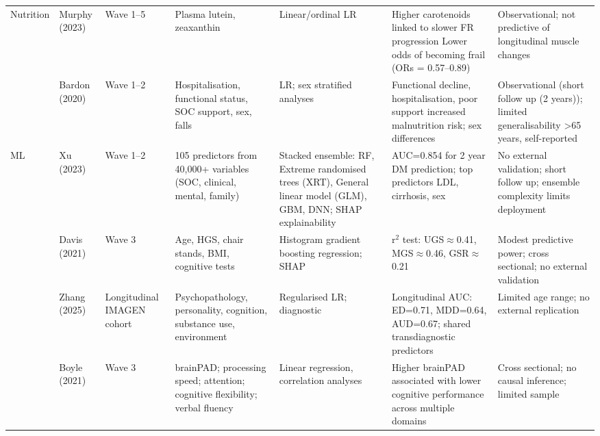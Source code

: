 \begin{table}[htbp]
{\begin{tabular}{p{2.5cm} p{2.5cm} p{2cm} p{4cm} p{4cm} p{4cm} p{4cm}}
\hline
\multirow{2}{*}{Nutrition} 
& Murphy (2023)~\cite{murphyPlasmaLuteinZeaxanthin2023} & Wave 1--5 & Plasma lutein, zeaxanthin & Linear/ordinal \gls{LR} & Higher carotenoids linked to slower \gls{FR} progression Lower odds of becoming frail (ORs = 0.57--0.89) & Observational; not predictive of longitudinal muscle changes \\
& Bardon (2020)~\cite{bardonPredictorsIncidentMalnutrition2020} & Wave 1--2 & Hospitalisation, functional status, \gls{SOC} support, sex, falls & \gls{LR}; sex stratified analyses & Functional decline, hospitalisation, poor support increased malnutrition risk; sex differences & Observational (short follow up (2 years)); limited generalisability >65 years, self-reported\\
\hline
\multirow{3}{*}{\gls{ML}} 
& Xu (2023)~\cite{xuTailoredMachineLearning2023} & Wave 1--2 & 105 predictors from 40,000+ variables (\gls{SOC}, clinical, mental, family) & Stacked ensemble: \gls{RF}, Extreme randomised trees (XRT), General linear model (GLM), \gls{GBM}, \gls{DNN}; \gls{SHAP} explainability & \gls{AUC}=0.854 for 2 year \gls{DM} prediction; top predictors LDL, cirrhosis, sex & No external validation; short follow up; ensemble complexity limits deployment \\
& Davis (2021)~\cite{davisComparisonGaitSpeed2021} & Wave 3 & Age, \gls{HGS}, chair stands, \gls{BMI}, cognitive tests & Histogram gradient boosting regression; \gls{SHAP} & r$^2$ test: \gls{UGS}$\approx$0.41, \gls{MGS}$\approx$0.46, GSR$\approx$0.21 & Modest predictive power; cross sectional; no external validation \\
& Zhang (2025)~\cite{zhangMachineLearningModels2025} & Longitudinal IMAGEN cohort & Psychopathology, personality, cognition, substance use, environment & Regularised \gls{LR}; diagnostic & Longitudinal \gls{AUC}: ED=0.71, MDD=0.64, AUD=0.67; shared transdiagnostic predictors & Limited age range; no external replication \\
& Boyle (2021)~\cite{boyleBrainpredictedAgeDifference2021} & Wave 3 & \gls{brainPAD}; processing speed; attention; cognitive flexibility; verbal fluency & Linear regression, correlation analyses & Higher \gls{brainPAD} associated with lower cognitive performance across multiple domains & Cross sectional; no causal inference; limited sample \\

\end{tabular}}
\end{table}

